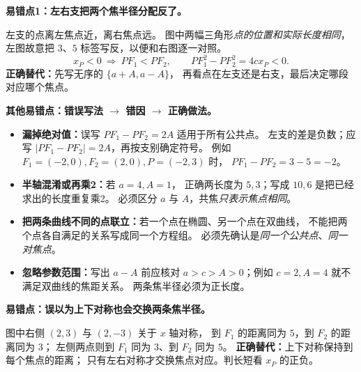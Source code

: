 \clearpage
\begin{trapbox}
\textbf{易错点1：左右支把两个焦半径分配反了。}

\begin{center}

\end{center}

左支的点离左焦点近，离右焦点远。
图中两幅三角形\emph{点的位置和实际长度相同}，
左图故意把 $3$、$5$ 标签写反，以便和右图逐一对照。
\[
\boxed{x_P<0\ \Longrightarrow\ PF_1<PF_2},\qquad
PF_1^2-PF_2^2=4cx_P<0.
\]
\textbf{正确替代：}先写无序的 $\{a+A,a-A\}$，
再看点在左支还是右支，最后决定哪段对应哪个焦点。
\end{trapbox}

\clearpage
\begin{trapbox}
\textbf{其他易错点：错误写法 $\to$ 错因 $\to$ 正确做法。}
\begin{itemize}
\item \textbf{漏掉绝对值：}误写
$PF_1-PF_2=2A$ 适用于所有公共点。
左支的差是负数；应写
$|PF_1-PF_2|=2A$，再按支别确定符号。
例如 $F_1=(-2,0),F_2=(2,0),P=(-2,3)$ 时，
$PF_1-PF_2=3-5=-2$。

\item \textbf{半轴混淆或再乘2：}若 $a=4,A=1$，
正确两长度为 $5,3$；写成 $10,6$ 是把已经求出的长度重复乘2。
必须区分 $a$ 与 $A$，共焦\emph{只表示焦点相同}。

\item \textbf{把两条曲线不同的点联立：}若一个点在椭圆、另一个点在双曲线，
不能把两个点各自满足的关系写成同一个方程组。
必须先确认是\emph{同一个公共点}、\emph{同一对焦点}。

\item \textbf{忽略参数范围：}写出 $a-A$ 前应核对
$a>c>A>0$；例如 $c=2,A=4$ 就不满足双曲线的焦距关系。
两条焦半径必须为正长度。
\end{itemize}
\end{trapbox}

\clearpage
\begin{trapbox}
\textbf{易错点：误以为上下对称也会交换两条焦半径。}

\begin{center}

\end{center}

图中右侧 $(2,3)$ 与 $(2,-3)$ 关于 $x$ 轴对称，
到 $F_1$ 的距离同为 $5$，到 $F_2$ 的距离同为 $3$；
左侧两点则到 $F_1$ 同为 $3$、到 $F_2$ 同为 $5$。
\textbf{正确替代：}上下对称保持到每个焦点的距离；
只有左右对称才交换焦点对应。判长短看 $x_P$ 的正负。
\end{trapbox}

